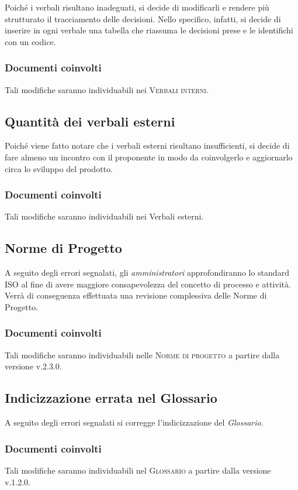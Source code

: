 \documentclass{article}
\begin{document}
Poiché i verbali risultano inadeguati, si decide di modificarli e rendere più strutturato il tracciamento delle decisioni. Nello specifico, infatti, si decide di inserire in ogni verbale una tabella che riassuma le decisioni prese e le identifichi con un codice.
\subsubsection*{Documenti coinvolti}
Tali modifiche saranno individuabili nei \textsc{Verbali interni}.

\subsection{Quantità dei verbali esterni}
\label{itm:6}

Poiché viene fatto notare che i verbali esterni risultano insufficienti, si decide di fare almeno un incontro con il proponente in modo da coinvolgerlo e aggiornarlo circa lo sviluppo del prodotto.
\subsubsection*{Documenti coinvolti}
Tali modifiche saranno individuabili nei Verbali esterni.

\subsection{Norme di Progetto}
\label{itm:7}

A seguito degli errori segnalati, gli \emph{amministratori} approfondiranno lo standard ISO al fine di avere maggiore consapevolezza del concetto di processo e attività. Verrà di conseguenza
effettuata una revisione complessiva delle Norme di Progetto.
\subsubsection*{Documenti coinvolti}
Tali modifiche saranno individuabili nelle \textsc{Norme di progetto} a partire dalla versione v.2.3.0.

\subsection{Indicizzazione errata nel Glossario}
\label{itm:7}

A seguito degli errori segnalati si corregge l'indicizzazione del \emph{Glossario}.
\subsubsection*{Documenti coinvolti}
Tali modifiche saranno individuabili nel \textsc{Glossario} a partire dalla versione v.1.2.0.
\end{document}
